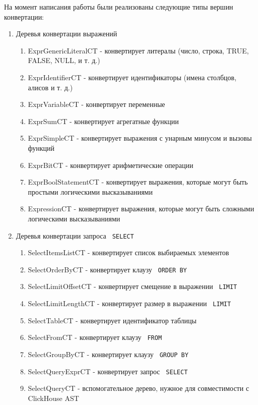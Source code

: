 На момент написания работы были реализованы следующие типы вершин конвертации:
\begin{enumerate}
    \item Деревья конвертации выражений \begin{enumerate}
        \item ExprGenericLiteralCT - конвертирует литералы (число, строка, TRUE, FALSE, NULL, и т. д.)
        \item ExprIdentifierCT - конвертирует идентификаторы (имена столбцов, алисов и т. д.)
        \item ExprVariableCT - конвертирует переменные
        \item ExprSumCT - конвертирует агрегатные функции
        \item ExprSimpleCT - конвертирует выражения с унарным минусом и вызовы функций
        \item ExprBitCT - конвертирует арифметические операции
        \item ExprBoolStatementCT - конвертирует выражения, которые могут быть простыми логическими высказываниями
        \item ExpressionCT - конвертирует выражения, которые могут быть сложными логическими высказываниями
    \end{enumerate}
    \item Деревья конвертации запроса \texttt{ SELECT } \begin{enumerate}
        \item SelectItemsListCT - конвертирует список выбираемых элементов
        \item SelectOrderByCT - конвертирует клаузу \texttt{ ORDER BY } 
        \item SelectLimitOffsetCT - конвертирует смещение в выражении \texttt{ LIMIT } 
        \item SelectLimitLengthCT - конвертирует размер в выражении \texttt{ LIMIT } 
        \item SelectTableCT - конвертирует идентификатор таблицы
        \item SelectFromCT - конвертирует клаузу \texttt{ FROM } 
        \item SelectGroupByCT - конвертирует клаузу \texttt{ GROUP BY} 
        \item SelectQueryExprCT - конвертирует запрос \texttt{ SELECT }
        \item SelectQueryCT - вспомогательное дерево, нужное для совместимости с ClickHouse AST

\end{enumerate}
\end{enumerate}
